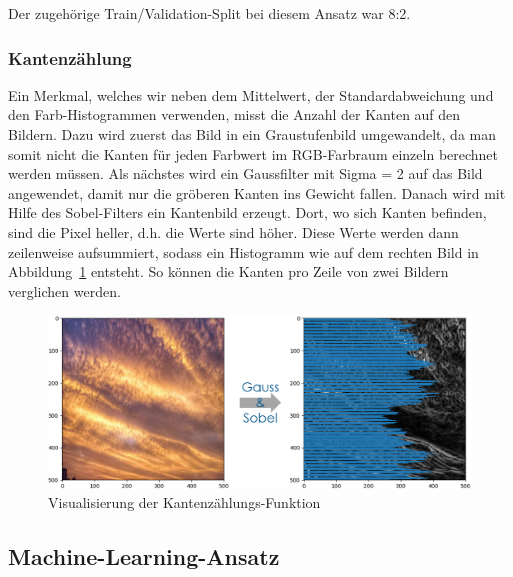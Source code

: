 \documentclass[a4,german]{article}
\begin{document}

Der zugehörige Train/Validation-Split bei diesem Ansatz war 8:2.

\subsubsection{Kantenzählung}
\label{sec:kanten}
Ein Merkmal, welches wir neben dem Mittelwert, der Standardabweichung und den Farb-Histogrammen verwenden, misst die Anzahl der Kanten auf den Bildern.
Dazu wird zuerst das Bild in ein Graustufenbild umgewandelt, da man somit nicht die Kanten für jeden Farbwert im RGB-Farbraum einzeln berechnet werden müssen. Als nächstes wird ein Gaussfilter mit Sigma = 2 auf das Bild angewendet, damit nur die gröberen Kanten ins Gewicht fallen. Danach wird mit Hilfe des Sobel-Filters ein Kantenbild erzeugt.
Dort, wo sich Kanten befinden, sind die Pixel heller, d.h. die Werte sind höher.
Diese Werte werden dann zeilenweise aufsummiert, sodass ein Histogramm wie auf dem rechten Bild in Abbildung~\ref{fig:kaz} entsteht. So können die Kanten pro Zeile von zwei Bildern verglichen werden.

\begin{figure}[h!]
\centering
\includegraphics[width=\textwidth]{Kantenzaehlung.png}
\caption{Visualisierung der Kantenzählungs-Funktion}
    \label{fig:kaz}
\end{figure}


\subsection{Machine-Learning-Ansatz}
\end{document}
